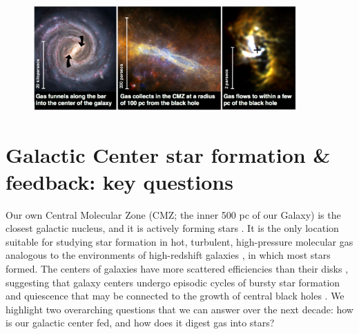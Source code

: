 \documentclass[modern]{aastex62}
\begin{document}
\begin{figure}[htp]
    \includegraphics[width=0.90\textwidth]{BetsyColorFig.png}
\end{figure}

\clearpage

\section{Galactic Center star formation \& feedback: key questions}



Our own Central Molecular Zone (CMZ; the inner 500 pc of our Galaxy) is the
closest galactic nucleus, and it is actively forming stars \citep{Morris1996a}.
It is the only location suitable for studying star formation in hot, turbulent,
high-pressure  \citep{Ao2013a, Ginsburg2016a, Krieger2017a}
molecular gas analogous to the environments of high-redshift galaxies
\citep{Kruijssen2013a}, in which most stars formed. The centers of 
galaxies have more scattered efficiencies than their disks
\citep{Leroy2013a,Usero2015a,Bigiel2016a,Gallagher2018a}, suggesting that
galaxy centers undergo episodic cycles of bursty star formation and quiescence
that may be connected to the growth of central black holes
\citep[e.g.,][]{Kruijssen2014c,Krumholz2017a,Torrey2017c,Seo2019a}.
We highlight two overarching questions that we can answer over the next decade:
how is our galactic center fed, and how does it digest gas into stars?
\end{document}
